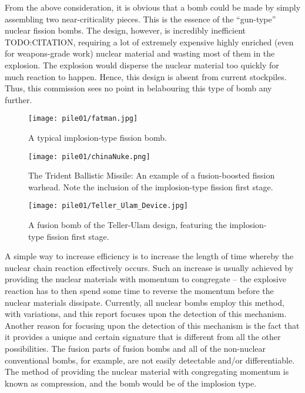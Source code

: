 \documentclass[twoside,titlepage,11pt,twocolumn,a4paper]{article}
\begin{document}
From the above consideration, it is obvious that a bomb could be made
by simply assembling two near-criticality pieces. This is the essence
of the ``gun-type'' nuclear fission bombs. The design, however, is
incredibly inefficient TODO:CITATION, requiring a lot of extremely
expensive highly enriched (even for weapons-grade work) nuclear
material and wasting most of them in the explosion. The explosion
would disperse the nuclear material too quickly for much reaction to
happen. Hence, this design is absent from current stockpiles. Thus,
this commission sees no point in belabouring this type of bomb any
further.

\begin{figure}
  \texttt{[image: pile01/fatman.jpg]}
  \caption{A typical implosion-type fission
    bomb. \citep{fatManAtomicArchive}}
\end{figure}
\begin{figure}
  \centering
  \texttt{[image: pile01/chinaNuke.png]}
  \caption{The Trident Ballistic Missile: An example of a
    fusion-boosted fission warhead. Note the inclusion of the
    implosion-type fission first
    stage. \citep{TridentBallisticMissile1999NYTimes}}
\end{figure}
\begin{figure}
  \texttt{[image: pile01/Teller\_Ulam\_Device.jpg]}
  \caption{A fusion bomb of the Teller-Ulam design, featuring the
    implosion-type fission first
    stage. \citep{tellerUlamAtomicArchive}}
\end{figure}

A simple way to increase efficiency is to increase the length of time
whereby the nuclear chain reaction effectively occurs. Such an
increase is usually achieved by providing the nuclear materials with
momentum to congregate -- the explosive reaction has to then spend
some time to reverse the momentum before the nuclear materials
dissipate. Currently, all nuclear bombs employ this method, with
variations, and this report focuses upon the detection of this
mechanism. Another reason for focusing upon the detection of this
mechanism is the fact that it provides a unique and certain signature
that is different from all the other possibilities. The fusion parts
of fusion bombs and all of the non-nuclear conventional bombs, for
example, are not easily detectable and/or differentiable. The method
of providing the nuclear material with congregating momentum is known
as compression, and the bomb would be of the implosion type.
\end{document}
